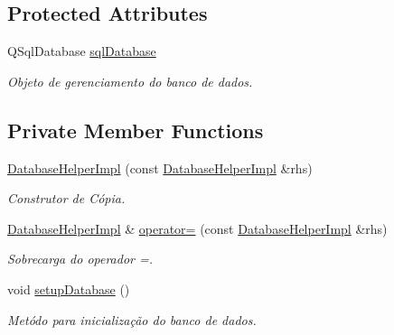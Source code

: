 \subsection*{Protected Attributes}
\begin{DoxyCompactItemize}
\item 
Q\+Sql\+Database \hyperlink{classDatabaseHelperImpl_a0bc1ee11321daa34b2abe7306c6184c2}{sql\+Database}\hypertarget{classDatabaseHelperImpl_a0bc1ee11321daa34b2abe7306c6184c2}{}\label{classDatabaseHelperImpl_a0bc1ee11321daa34b2abe7306c6184c2}

\begin{DoxyCompactList}\small\item\em Objeto de gerenciamento do banco de dados. \end{DoxyCompactList}\end{DoxyCompactItemize}
\subsection*{Private Member Functions}
\begin{DoxyCompactItemize}
\item 
\hyperlink{classDatabaseHelperImpl_a88e80bd1c92b35e3e8a4fe1238215245}{Database\+Helper\+Impl} (const \hyperlink{classDatabaseHelperImpl}{Database\+Helper\+Impl} \&rhs)
\begin{DoxyCompactList}\small\item\em Construtor de Cópia. \end{DoxyCompactList}\item 
\hyperlink{classDatabaseHelperImpl}{Database\+Helper\+Impl} \& \hyperlink{classDatabaseHelperImpl_a48022ad027303dc93626f3293887b98e}{operator=} (const \hyperlink{classDatabaseHelperImpl}{Database\+Helper\+Impl} \&rhs)
\begin{DoxyCompactList}\small\item\em Sobrecarga do operador =. \end{DoxyCompactList}\item 
void \hyperlink{classDatabaseHelperImpl_af1b1b1496a9027cd09ee0456010ad9bd}{setup\+Database} ()
\begin{DoxyCompactList}\small\item\em Metódo para inicialização do banco de dados. \end{DoxyCompactList}\end{DoxyCompactItemize}
